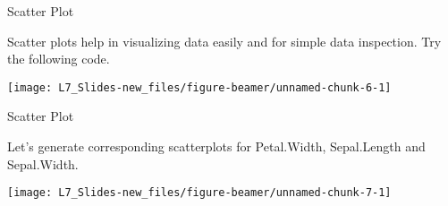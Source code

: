 \documentclass[ignorenonframetext,]{beamer}
\newenvironment{Shaded}{\begin{snugshade}}{\end{snugshade}}
\newcommand{\KeywordTok}[1]{\textcolor{white}{\textbf{{#1}}}}
\newcommand{\NormalTok}[1]{\textcolor{yellow}{{#1}}}
\newcommand{\DataTypeTok}[1]{\textcolor{yellow}{{#1}}}
\newcommand{\DecValTok}[1]{\textcolor{numbercolor}{{#1}}}
\newcommand{\StringTok}[1]{\textcolor{yellow}{{#1}}}
\begin{document}
\begin{frame}[fragile]{Scatter Plot}

Scatter plots help in visualizing data easily and for simple data
inspection. Try the following code.

\small

\begin{Shaded}
\end{Shaded}

\begin{center}\texttt{[image: L7\_Slides-new\_files/figure-beamer/unnamed-chunk-6-1]} \end{center}

\end{frame}

\begin{frame}[fragile]{Scatter Plot}

Let's generate corresponding scatterplots for Petal.Width, Sepal.Length
and Sepal.Width.

\small

\begin{Shaded}
\end{Shaded}

\begin{center}\texttt{[image: L7\_Slides-new\_files/figure-beamer/unnamed-chunk-7-1]} \end{center}

\end{frame}
\end{document}
